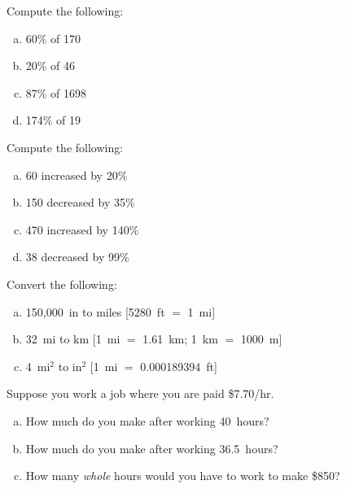 \documentclass[11pt,letterpaper]{article}
\begin{document}


 Compute the following:
\begin{enumerate}[(a)]
\item 60\% of 170
\item 20\% of 46
\item 87\% of 1698
\item 174\% of 19
\end{enumerate}



\newpage



 Compute the following:
\begin{enumerate}[(a)]
\item 60 increased by 20\%
\item 150 decreased by 35\%
\item 470 increased by 140\%
\item 38 decreased by 99\%
\end{enumerate}



\newpage



 Convert the following:
\begin{enumerate}[(a)]
\item 150,000~in to miles [5280~ft $=$ 1~mi]
\item 32~mi to km [1~mi $=$ 1.61~km; 1~km $=$ 1000~m]
\item 4~mi$^2$ to in$^2$ [1~mi $=$ 0.000189394~ft]
\end{enumerate}



\newpage



 Suppose you work a job where you are paid \$7.70/hr. 
\begin{enumerate}[(a)]
\item How much do you make after working 40~hours?
\item How much do you make after working 36.5~hours?
\item How many \textit{whole} hours would you have to work to make \$850?
\end{enumerate}



\newpage
\end{document}
